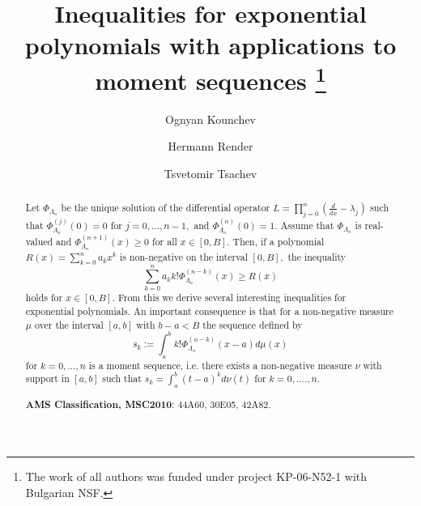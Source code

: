 \documentclass[11pt]{article}%
\begin{document}
\author{Ognyan Kounchev
\and Hermann Render
\and Tsvetomir Tsachev}
\title{Inequalities for exponential polynomials with applications to moment sequences
\thanks{The work of all authors was funded under project KP-06-N52-1 with
Bulgarian NSF.} }
\date{}
\maketitle

\begin{abstract}
Let $\Phi_{\Lambda_{n}}$ be the unique solution of the differential operator
$L=\prod_{j=0}^{n}\left(  \frac{d}{dx}-\lambda_{j}\right)  $ such that
$\Phi_{\Lambda_{n}}^{\left(  j\right)  }\left(  0\right)  =0$ for
$j=0,...,n-1,$ and $\Phi_{\Lambda_{n}}^{\left(  n\right)  }\left(  0\right)
=1.$ Assume that $\Phi_{\Lambda_{n}}$ is real-valued and $\Phi_{\Lambda_{n}%
}^{\left(  n+1\right)  }\left(  x\right)  \geq0$ for all $x\in\left[
0,B\right]  .$ Then, if a polynomial $R\left(  x\right)  =%
{\displaystyle\sum_{k=0}^{n}}
a_{k}x^{k}$ is non-negative on the interval $\left[  0,B\right]  ,$ the
inequality
\[%
{\displaystyle\sum_{k=0}^{n}}
a_{k}k!\Phi_{\Lambda_{n}}^{\left(  n-k\right)  }\left(  x\right)  \geq
R\left(  x\right)
\]
holds for $x\in\left[  0,B\right]  $. From this we derive several interesting
inequalities for exponential polynomials. An important consequence is that for
a non-negative measure $\mu$ over the interval $\left[  a,b\right]  $ with
$b-a<B$ the sequence defined by
\[
s_{k}:=\int_{a}^{b}k!\Phi_{\Lambda_{n}}^{\left(  n-k\right)  }\left(
x-a\right)  d\mu\left(  x\right)
\]
for $k=0,...,n$ is a moment sequence, i.e. there exists a non-negative measure
$\nu$ with support in $\left[  a,b\right]  $ such that $s_{k}=\int_{a}%
^{b}\left(  t-a\right)  ^{k}d\nu\left(  t\right)  $ for $k=0,....,n.$

\textbf{AMS Classification, MSC2010}: 44A60, 30E05, 42A82. 

\end{abstract}

\end{document}
